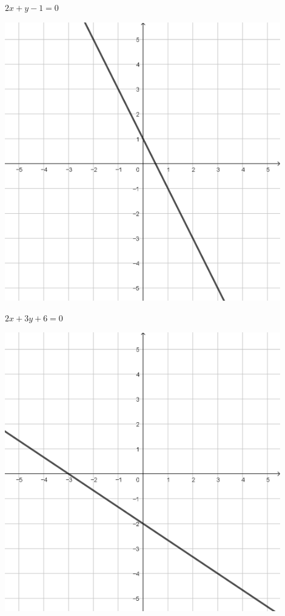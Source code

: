 \documentclass{oblivoir}
\begin{document}
%
\begin{minipage}{0.45\textwidth}
\clearpage
\begin{minipage}{0.45\textwidth}\centering
\(2x+y-1=0\)
\par\bigskip\includegraphics[width=0.9\textwidth]{L07}
\end{minipage}
\begin{minipage}{0.45\textwidth}\centering
\(2x+3y+6=0\)
\par\bigskip\includegraphics[width=0.9\textwidth]{L08}

\end{minipage}
\end{minipage}
\end{document}
